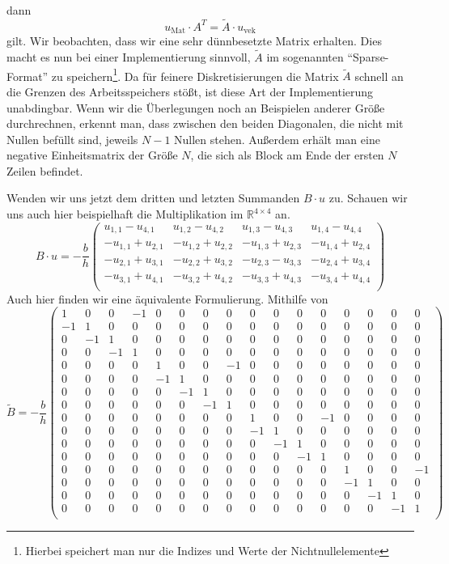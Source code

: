 \documentclass[12pt,a4paper]{scrartcl}
\numberwithin{equation}{section} %
\theoremstyle{definition}
\theoremstyle{plain}
\newcommand{\rr}{\mathbb{R}}
\begin{document}
dann \begin{equation}
u_{\text{Mat}}\cdot A^T=\tilde{A}\cdot u_{\text{vek}}
\end{equation}
gilt. Wir beobachten, dass wir eine sehr dünnbesetzte Matrix erhalten. Dies macht es nun bei einer Implementierung sinnvoll, $\tilde{A}$ im sogenannten "`Sparse-Format"' zu speichern\footnote{Hierbei speichert man nur die Indizes und Werte der Nichtnullelemente}. Da für feinere Diskretisierungen die Matrix $\tilde{A}$ schnell an die Grenzen des Arbeitsspeichers stößt, ist diese Art der Implementierung unabdingbar. Wenn wir die Überlegungen noch an Beispielen anderer Größe durchrechnen, erkennt man, dass zwischen den beiden Diagonalen, die nicht mit Nullen befüllt sind, jeweils $N-1$ Nullen stehen. Außerdem erhält man eine negative Einheitsmatrix der Größe $N$, die sich als Block am Ende der ersten $N$ Zeilen befindet.\par
Wenden wir uns jetzt dem dritten und letzten Summanden $B\cdot u$ zu. Schauen wir uns auch hier beispielhaft die Multiplikation im $\rr^{4\times 4}$ an. 
\begin{equation}
B\cdot u=-\frac{b}{h}\begin{pmatrix}
u_{1,1}-u_{4,1}&u_{1,2}-u_{4,2}&u_{1,3}-u_{4,3}&u_{1,4}-u_{4,4}\\
-u_{1,1}+u_{2,1}&-u_{1,2}+u_{2,2}&-u_{1,3}+u_{2,3}&-u_{1,4}+u_{2,4}\\
-u_{2,1}+u_{3,1}&-u_{2,2}+u_{3,2}&-u_{2,3}-u_{3,3}&-u_{2,4}+u_{3,4}\\
-u_{3,1}+u_{4,1}&-u_{3,2}+u_{4,2}&-u_{3,3}+u_{4,3}&-u_{3,4}+u_{4,4}\\
\end{pmatrix}
\end{equation}
Auch hier finden wir eine äquivalente Formulierung. Mithilfe von 
\begin{equation}
\tilde{B}=-\frac{b}{h}\begin{pmatrix}
1&0&0&-1&0&0&0&0&0&0&0&0&0&0&0&0\\
-1&1&0&0&0&0&0&0&0&0&0&0&0&0&0&0\\
0&-1&1&0&0&0&0&0&0&0&0&0&0&0&0&0\\
0&0&-1&1&0&0&0&0&0&0&0&0&0&0&0&0\\
0&0&0&0&1&0&0&-1&0&0&0&0&0&0&0&0\\
0&0&0&0&-1&1&0&0&0&0&0&0&0&0&0&0\\
0&0&0&0&0&-1&1&0&0&0&0&0&0&0&0&0\\
0&0&0&0&0&0&-1&1&0&0&0&0&0&0&0&0\\
0&0&0&0&0&0&0&0&1&0&0&-1&0&0&0&0\\
0&0&0&0&0&0&0&0&-1&1&0&0&0&0&0&0\\
0&0&0&0&0&0&0&0&0&-1&1&0&0&0&0&0\\
0&0&0&0&0&0&0&0&0&0&-1&1&0&0&0&0\\
0&0&0&0&0&0&0&0&0&0&0&0&1&0&0&-1\\
0&0&0&0&0&0&0&0&0&0&0&0&-1&1&0&0\\
0&0&0&0&0&0&0&0&0&0&0&0&0&-1&1&0\\
0&0&0&0&0&0&0&0&0&0&0&0&0&0&-1&1\\
\end{pmatrix}
\end{equation}
\end{document}

